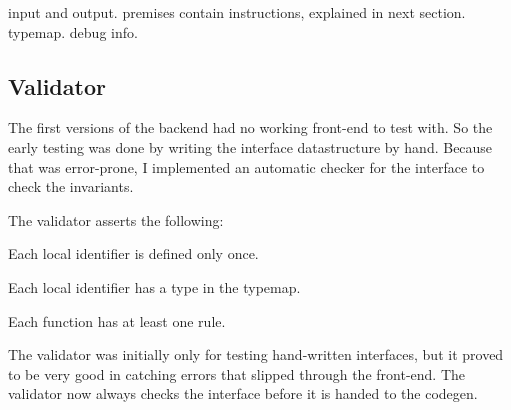 input and output.
premises contain instructions, explained in next section.
typemap.
debug info.

\subsection{Validator}
The first versions of the backend had no working front-end to test with.
So the early testing was done by writing the interface datastructure by hand.
Because that was error-prone, I implemented an automatic checker for the interface to check the invariants.

The validator asserts the following:
\begin{enumeration}
\item Each local identifier is defined only once.
\item Each local identifier has a type in the typemap.
\item Each function has at least one rule.
\end{enumeration}

The validator was initially only for testing hand-written interfaces,
but it proved to be very good in catching errors that slipped through the front-end.
The validator now always checks the interface before it is handed to the codegen.

